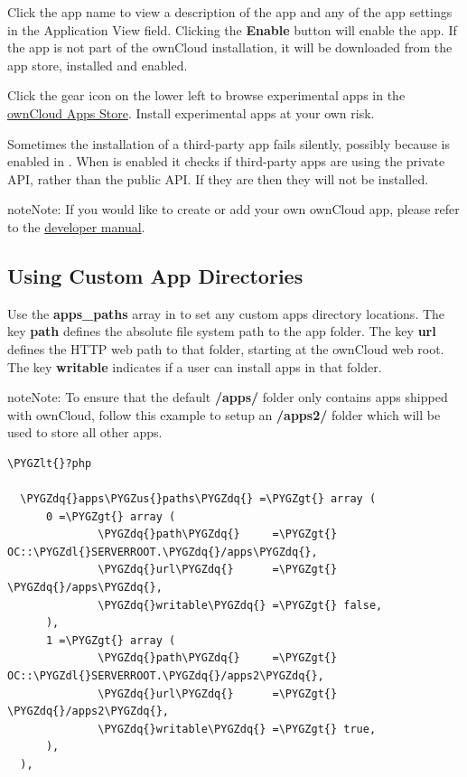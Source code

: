 \documentclass[letterpaper,10pt,english]{sphinxmanual}
\def\PYGZus{\char`\_}
\def\PYGZlt{\char`\<}
\def\PYGZgt{\char`\>}
\def\PYGZdl{\char`\$}
\def\PYGZdq{\char`\"}
\begin{document}
Click the app name to view a description of the app and any of the app settings in the Application View field.  Clicking the \textbf{Enable} button will enable the app.  If the app is not part of the ownCloud installation, it will be downloaded from the app store, installed and enabled.

Click the gear icon on the lower left to browse experimental apps in the \href{https://apps.owncloud.com/}{ownCloud Apps
Store}. Install experimental apps at your own risk.

Sometimes the installation of a third-party app fails silently, possibly because
 is enabled in . When  is
enabled it checks if third-party apps are using the private API, rather than the public
API. If they are then they will not be installed.

\begin{notice}{note}{Note:}
If you would like to create or add your own ownCloud app, please
refer to the \href{https://doc.owncloud.org/server/9.0/developer\_manual/app/index.html}{developer manual}.
\end{notice}


\subsection{Using Custom App Directories}
\label{installation/apps_management_installation:using-custom-app-directories}
Use the \textbf{apps\_paths} array in  to set any custom apps directory
locations. The key \textbf{path} defines the absolute file system path to the app
folder. The key \textbf{url} defines the HTTP web path to that folder, starting at
the ownCloud web root. The key \textbf{writable} indicates if a user can install apps
in that folder.

\begin{notice}{note}{Note:}
To ensure that the default \textbf{/apps/} folder only contains apps
shipped with ownCloud, follow this example to setup an \textbf{/apps2/} folder
which will be used to store all other apps.
\end{notice}

\begin{Verbatim}[commandchars=\\\{\}]
\PYGZlt{}?php

  \PYGZdq{}apps\PYGZus{}paths\PYGZdq{} =\PYGZgt{} array (
      0 =\PYGZgt{} array (
              \PYGZdq{}path\PYGZdq{}     =\PYGZgt{} OC::\PYGZdl{}SERVERROOT.\PYGZdq{}/apps\PYGZdq{},
              \PYGZdq{}url\PYGZdq{}      =\PYGZgt{} \PYGZdq{}/apps\PYGZdq{},
              \PYGZdq{}writable\PYGZdq{} =\PYGZgt{} false,
      ),
      1 =\PYGZgt{} array (
              \PYGZdq{}path\PYGZdq{}     =\PYGZgt{} OC::\PYGZdl{}SERVERROOT.\PYGZdq{}/apps2\PYGZdq{},
              \PYGZdq{}url\PYGZdq{}      =\PYGZgt{} \PYGZdq{}/apps2\PYGZdq{},
              \PYGZdq{}writable\PYGZdq{} =\PYGZgt{} true,
      ),
  ),
\end{Verbatim}
\end{document}

